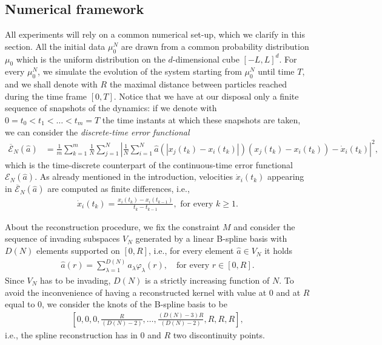 \subsection{Numerical framework}\label{numfram}

All experiments will rely on a common numerical set-up, which we clarify in this section. All the initial data $\mu^N_0$ are drawn from a common probability distribution $\mu_0$ which is the uniform distribution on the $d$-dimensional cube $[-L,L]^d$. For every $\mu^N_0$, we simulate the evolution of the system starting from $\mu^N_0$ until time $T$, and we shall denote with $R$ the maximal distance between particles reached during the time frame $[0,T]$. Notice that we have at our disposal only a finite sequence of snapshots of the dynamics: if we denote with $0 = t_0 < t_1 < \ldots < t_m = T$ the time instants at which these snapshots are taken, we can consider the \textit{discrete-time error functional}
\begin{align*}
\overline{\mathcal{E}}_N(\widehat{a}) & = \frac{1}{m} \sum^m_{k = 1} \frac{1}{N} \sum^N_{j = 1} \left| \frac{1}{N} \sum^N_{i = 1} \widehat{a}(|x_j(t_k) - x_i(t_k)|)(x_j(t_k) - x_i(t_k)) - \dot{x}_i(t_k)\right|^2,
\end{align*}
which is the time-discrete counterpart of the continuous-time error functional $\mathcal{E}_N(\widehat{a})$. As already mentioned in the introduction, velocities $\dot{x}_i(t_k)$ appearing in $\overline{\mathcal{E}}_N(\widehat{a})$ are computed as finite differences, i.e.,
\begin{align*}
\dot{x}_i(t_k) = \frac{x_i(t_k) - x_i(t_{k-1})}{t_k - t_{k-1}}, \text{ for every } k \geq 1.
\end{align*}

About the reconstruction procedure, we fix the constraint $M$ and consider the sequence of invading subspaces $V_N$ generated by a linear B-spline basis with $D(N) $ elements supported on $[0,R]$, i.e., for every element $\widehat{a} \in V_N$ it holds
\begin{align*}
	\widehat{a}(r) = \sum^{D(N)}_{\lambda = 1} a_{\lambda} \varphi_{\lambda}(r), \quad \text{for every } r \in [0,R].
\end{align*}
Since $V_N$ has to be invading, $D(N)$ is a strictly increasing function of $N$. To avoid the inconvenience of having a reconstructed kernel with value at $0$ and at $R$ equal to $0$, we consider the knots of the B-spline basis to be
\begin{align}\label{eq:knots}
\left[0,0,0,\frac{R}{(D(N)-2)},\ldots,\frac{(D(N) - 3)R}{(D(N)-2)},R,R,R\right],
\end{align}
i.e., the spline reconstruction has in $0$ and $R$ two discontinuity points.

